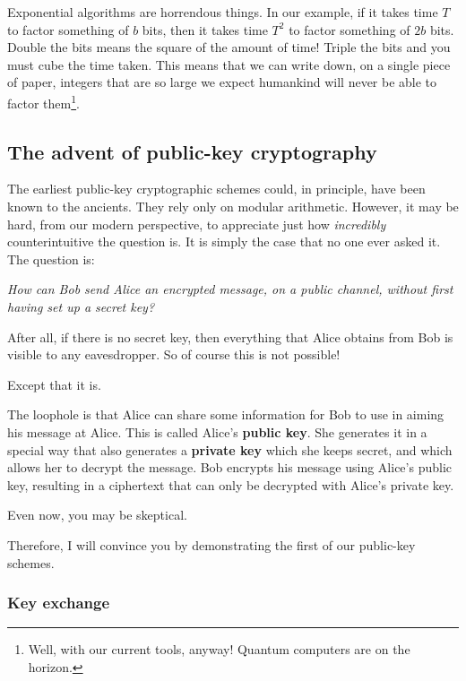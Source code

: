 \documentclass{article}
\theoremstyle{plain}
\theoremstyle{definition}
\theoremstyle{remark}
\numberwithin{theorem}{section}
\begin{document}
Exponential algorithms are horrendous things.  In our example, if it takes time $T$ to factor something of $b$ bits, then it takes time $T^2$ to factor something of $2b$ bits.  Double the bits means the square of the amount of time!  Triple the bits and you must cube the time taken.  This means that we can write down, on a single piece of paper, integers that are so large we expect humankind will never be able to factor them\footnote{Well, with our current tools, anyway!  Quantum computers are on the horizon.}.



\subsection{The advent of public-key cryptography}

The earliest public-key cryptographic schemes could, in principle, have been known to the ancients.  They rely only on modular arithmetic.  However, it may be hard, from our modern perspective, to appreciate just how \emph{incredibly} counterintuitive the question is.  It is simply the case that no one ever asked it.  The question is:

\emph{How can Bob send Alice an encrypted message, on a public channel, without first having set up a secret key?}

After all, if there is no secret key, then everything that Alice obtains from Bob is visible to any eavesdropper.  So of course this is not possible!

Except that it is.

The loophole is that Alice can share some information for Bob to use in aiming his message at Alice.  This is called Alice's \textbf{public key}.  She generates it in a special way that also generates a \textbf{private key} which she keeps secret, and which allows her to decrypt the message.  Bob encrypts his message using Alice's public key, resulting in a ciphertext that can only be decrypted with Alice's private key.

Even now, you may be skeptical.  


Therefore, I will convince you by demonstrating the first of our public-key schemes.  



\subsubsection{Key exchange}
\end{document}
